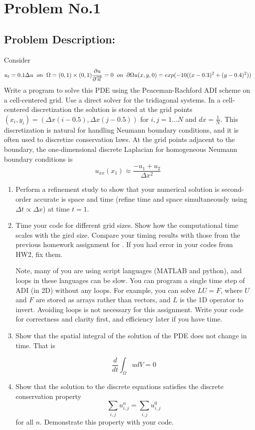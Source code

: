 \section{Problem No.1} \label{sec:prob2}
\subsection{Problem Description:} 

Consider 
$$
u_{t} =0.1 \Delta u \; \; on \; \;  \Omega = (0,1) \times (0,1)\\
\frac{\partial u}{\partial \overrightarrow{n}} = 0 \; \; on  \; \; \partial \Omega \\
u(x,y,0) = exp(-10((x-0.3)^2 +(y-0.4)^2))
$$
Write a program to solve this PDE using the Peaceman-Rachford ADI scheme on a cell-centered grid. Use a direct solver for the tridiagonal systems. In a cell-centered discretization the solution is stored at the grid points $(x_{i},y_{i}) = (\Delta x(i-0.5), \Delta x(j-0.5))$ for $i,j=1...N$ and $dx=\frac{1}{N}$. This discretization is natural for handling Neumann boundary conditions, and it is often used to discretize conservation laws. At the grid points adjacent to the boundary, the one-dimensional discrete Laplacian for homogeneous Neumann boundary conditions is 
$$
u_{xx}(x_{1}) \approx \frac{-u_{1}+u_{2}}{\Delta x^{2}}
$$
\begin{enumerate}
\item Perform a refinement study to show that your numerical solution is second-order accurate is space and time (refine time and space simultaneously using $\Delta t \propto \Delta x$) at time $t=1$.
\item Time your code for different grid sizes. Show how the computational time scales with the gird size. Compare your timing results with those from the previous homework assignment for \cn. If you had error in your codes from HW2, fix them.

Note, many of you are using script languages (MATLAB and python), and loops in these languages can be slow. You can program a single time step of ADI (in 2D) without any loops. For example, you can solve $LU=F$, where $U$ and $F$ are stored as arrays rather than vectors, and $L$ is the 1D operator to invert. Avoiding loops is not necessary for this assignment. Write your code for correctness and clarity first, and efficiency later if you have time.
\item Show that the spatial integral of the solution of the PDE does not change in time. That is 

$$
\frac{d}{dt} \int_{\Omega} u dV=0
$$
\item Show that the solution to the discrete equations satisfies the discrete conservation property 
$$
\sum_{i,j} u_{i,j}^{n} = \sum_{i,j}u_{i,j}^{0}
$$
for all $n$. Demonstrate this property with your code. 


\end{enumerate}

